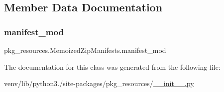 \subsection{Member Data Documentation}
\mbox{\label{classpkg__resources_1_1MemoizedZipManifests_a274e5a889fe7b201cdc04af67c10e708}} 
\subsubsection{\texorpdfstring{manifest\+\_\+mod}{manifest\_mod}}
{\footnotesize\ttfamily pkg\+\_\+resources.\+Memoized\+Zip\+Manifests.\+manifest\+\_\+mod\hspace{0.3cm}{\ttfamily [static]}}



The documentation for this class was generated from the following file\+:\begin{DoxyCompactItemize}
\item 
venv/lib/python3./site-\/packages/pkg\+\_\+resources/\hyperlink{venv_2lib_2python3_89_2site-packages_2pkg__resources_2____init_____8py}{\+\_\+\+\_\+init\+\_\+\+\_\+.\+py}\end{DoxyCompactItemize}
